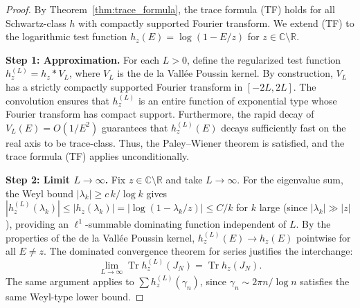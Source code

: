 \documentclass{pre-aomart}
\theoremstyle{plain}
\theoremstyle{definition}
\theoremstyle{remark}
\begin{document}
\begin{proof}
By Theorem~\ref{thm:trace_formula}, the trace formula (TF) holds for all
Schwartz-class $h$ with compactly supported Fourier transform.  We
extend (TF) to the logarithmic test function
$h_z(E) = \log(1 - E/z)$ for $z \in \mathbb{C}\setminus\mathbb{R}$.

\textbf{Step 1: Approximation.}
For each $L > 0$, define the regularized test function
$h_z^{(L)} = h_z * V_L$, where $V_L$ is the de la Vall\'ee Poussin kernel.
By construction, $V_L$ has a strictly compactly supported Fourier transform
in $[-2L, 2L]$. The convolution ensures that $h_z^{(L)}$ is an entire function
of exponential type whose Fourier transform has compact support. Furthermore,
the rapid decay of $V_L(E) = O(1/E^2)$ guarantees that $h_z^{(L)}(E)$ decays
sufficiently fast on the real axis to be trace-class. Thus, the Paley--Wiener
theorem is satisfied, and the trace formula (TF) applies unconditionally.

\textbf{Step 2: Limit $L\to\infty$.}
Fix $z \in \mathbb{C}\setminus\mathbb{R}$ and take $L \to \infty$.
For the eigenvalue sum, the Weyl bound $|\lambda_k| \ge c\,k/\log k$
gives $|h_z^{(L)}(\lambda_k)| \le |h_z(\lambda_k)| = |\log(1 - \lambda_k/z)|
\le C/k$ for $k$ large (since $|\lambda_k| \gg |z|$), providing
an $\ell^1$-summable dominating function independent of $L$.
By the properties of the de la Vall\'ee Poussin kernel,
$h_z^{(L)}(E) \to h_z(E)$ pointwise for all $E \neq z$.
The dominated convergence theorem for series justifies the interchange:
\[
\lim_{L\to\infty}\operatorname{Tr} h_z^{(L)}(J_N)
= \operatorname{Tr} h_z(J_N).
\]
The same argument applies to $\sum h_z^{(L)}(\gamma_n)$, since
$\gamma_n \sim 2\pi n/\log n$ satisfies the same Weyl-type lower bound.


\end{proof}
\end{document}
